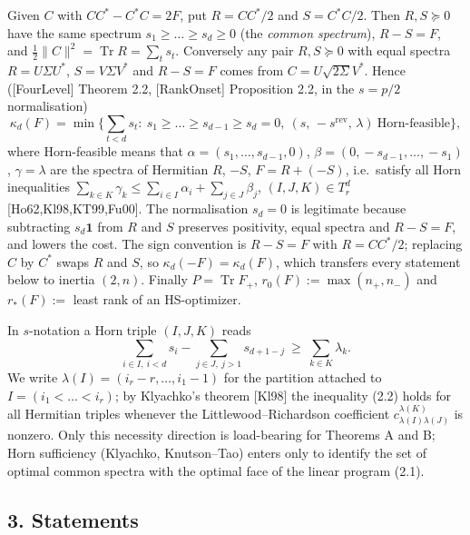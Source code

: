 \documentclass[
  11pt,
  a4paper,
]{article}
\begin{document}
Given \(C\) with \(CC^*-C^*C=2F\), put \(R=CC^*/2\) and \(S=C^*C/2\).
Then \(R,\allowbreak{}S\succeq0\) have the same spectrum \(s_1\ge\dots\ge s_d\ge0\)
(the \emph{common spectrum}), \(R-S=F\), and
\(\tfrac12\|C\|^2=\operatorname{Tr}R=\sum_t s_t\). Conversely any pair
\(R,\allowbreak{}S\succeq0\) with equal spectra \(R=U\Sigma U^*\), \(S=V\Sigma V^*\)
and \(R-S=F\) comes from \(C=U\sqrt{2\Sigma}V^*\). Hence
({[}FourLevel{]} Theorem 2.2, {[}RankOnset{]} Proposition 2.2, in the
\(s=p/2\) normalisation)
\[\kappa_d(F)=\min\Big\{\sum_{t<d}s_t:\ s_1\ge\dots\ge s_{d-1}\ge s_d=0,\ (s,\,-s^{\mathrm{rev}},\,\lambda)\ \text{Horn-feasible}\Big\},\tag{2.1}\]
where Horn-feasible means that \(\alpha=(s_1,\allowbreak{}\dots,\allowbreak{}s_{d-1},\allowbreak{}0)\),
\(\beta=(0,\allowbreak{}-s_{d-1},\allowbreak{}\dots,\allowbreak{}-s_1)\), \(\gamma=\lambda\) are the spectra of
Hermitian \(R\), \(-S\), \(F=R+(-S)\), i.e.~satisfy all Horn
inequalities
\(\sum_{k\in K}\gamma_k\le\sum_{i\in I}\alpha_i+\sum_{j\in J}\beta_j\),
\((I,\allowbreak{}J,\allowbreak{}K)\in T^d_r\) {[}Ho62,Kl98,KT99,Fu00{]}. The normalisation
\(s_d=0\) is legitimate because subtracting \(s_d\mathbf 1\) from \(R\)
and \(S\) preserves positivity, equal spectra and \(R-S=F\), and lowers
the cost. The sign convention is \(R-S=F\) with \(R=CC^*/2\); replacing
\(C\) by \(C^*\) swaps \(R\) and \(S\), so \(\kappa_d(-F)=\kappa_d(F)\),
which transfers every statement below to inertia \((2,\allowbreak{}n)\). Finally
\(P=\operatorname{Tr}F_+\), \(r_0(F):=\max(n_+,\allowbreak{}n_-)\) and \(r_*(F):=\)
least rank of an HS-optimizer.

In \(s\)-notation a Horn triple \((I,\allowbreak{}J,\allowbreak{}K)\) reads
\[\sum_{i\in I,\ i<d}s_i-\sum_{j\in J,\ j>1}s_{d+1-j}\ \ge\ \sum_{k\in K}\lambda_k.\tag{2.2}\]
We write \(\lambda(I)=(i_r-r,\allowbreak{}\dots,\allowbreak{}i_1-1)\) for the partition attached
to \(I=(i_1<\dots<i_r)\); by Klyachko's theorem {[}Kl98{]} the
inequality (2.2) holds for all Hermitian triples whenever the
Littlewood--Richardson coefficient
\(c^{\lambda(K)}_{\lambda(I)\lambda(J)}\) is nonzero. Only this
necessity direction is load-bearing for Theorems A and B; Horn
sufficiency (Klyachko, Knutson--Tao) enters only to identify the set of
optimal common spectra with the optimal face of the linear program
(2.1).

\subsection{3. Statements}\label{statements}
\end{document}
